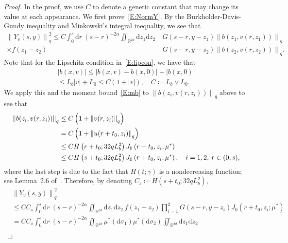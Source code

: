 \documentclass[sn-mathphys]{sn-jnl}%
\newcommand{\BR}{\mathbb{R}}
\newcommand{\Norm}[1]{\left\| #1 \right\|}
\newcommand{\ud}{\ensuremath{\mathrm{d}}}
\numberwithin{equation}{section}
\theoremstyle{thmstyleone}%
\theoremstyle{thmstyletwo}%
\theoremstyle{thmstylethree}%
\begin{document}
\begin{proof}
  In the proof, we use $C$ to denote a generic constant that may change its value at each
  appearance. We first prove~\eqref{E:NormY}. By the Burkholder-Davis-Gundy inequality and
  Minkowski's integral inequality, we see that
  \begin{align*}
    \Norm{Y_v(s,y)}_q^2 \le
    C \int_0^s \ud r \: (s-r)^{-2\alpha}
    \iint_{\BR^{2d}} \ud z_1\ud z_2 \: & G(s-r,y-z_1) \Norm{b\left(z_1,v(r,z_1)\right)}_q \\
    \times f(z_1-z_2)                  & G(s-r,y-z_2) \Norm{b\left(z_2,v(r,z_2)\right)}_q.
  \end{align*}
  Note that for the Lipschitz condition in~\eqref{E:lipcon}, we have that
  \begin{gather*}
    \lvert b\left(x,v\right) \rvert
      \le \lvert b\left(x,v\right) - b\left(x,0\right)\rvert + \lvert b\left(x,0\right)\rvert \\
      \le L_b \lvert v \rvert + L_0 \le C (1+\lvert v \rvert),\quad C \coloneqq L_b\vee L_0.
  \end{gather*}
  We apply this and the moment bound~\eqref{E:mb} to $\Norm{b(z_i, v(r,z_i))}_q$ above to see that
  \begin{align}\label{E:NormB}
    \Norm{b(z_i, v(r,z_i))}_q
    & \le C\left(1+\Norm{v(r,z_i)}_q\right)                               \notag \\
    & =   C\left(1+\Norm{u(r+t_0,z_i)}_q\right)                           \notag \\
    & \le C H\left(r+t_0;32qL_b^2\right) J_0\left(r + t_0,z_i;\mu^*\right)\notag \\
    & \le C H\left(s+t_0;32qL_b^2\right) J_0\left(r + t_0,z_i;\mu^*\right), \quad i = 1,2, \: r\in(0,s),
  \end{align}
  where the last step is due to the fact that $H(t;\gamma)$ is a nondecreasing function; see
  Lemma~2.6 of~\cite{chen.kim:19:nonlinear}. Therefore, by denoting $C_s \coloneqq
  H\left(s+t_0;32qL_b^2\right)$,
  \begin{align*}
    & \Norm{Y_v(s,y)}_q^2                                                                                                                                                      \\
    & \le C C_s \int_0^s \ud r \: (s-r)^{-2\alpha} \iint_{\BR^{2d}} \ud z_1\ud z_2\: f(z_1-z_2) \prod_{i = 1}^2 G(s-r,y-z_i) J_0\left(r + t_0,z_i;\mu^*\right)                  \\
    & = C C_s \int_0^s \ud r \: (s-r)^{-2\alpha} \iint_{\BR^{2d}} \mu^* (\ud \sigma_1) \mu^* (\ud \sigma_2) \iint_{\BR^{2d}} \ud z_1\ud z_2                                      \\

\end{align*}
\end{proof}
\end{document}
